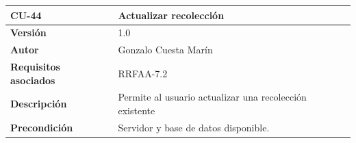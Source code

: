 \documentclass[
]{article}
\begin{document}
\begin{longtable}[]{@{}ll@{}}
\toprule
\begin{minipage}[b]{0.22\columnwidth}\raggedright
\textbf{CU-44}\strut
\end{minipage} & \begin{minipage}[b]{0.72\columnwidth}\raggedright
\textbf{Actualizar recolección}\strut
\end{minipage}\tabularnewline
\midrule
\endhead
\begin{minipage}[t]{0.22\columnwidth}\raggedright
\textbf{Versión}\strut
\end{minipage} & \begin{minipage}[t]{0.72\columnwidth}\raggedright
1.0\strut
\end{minipage}\tabularnewline
\begin{minipage}[t]{0.22\columnwidth}\raggedright
\textbf{Autor}\strut
\end{minipage} & \begin{minipage}[t]{0.72\columnwidth}\raggedright
Gonzalo Cuesta Marín\strut
\end{minipage}\tabularnewline
\begin{minipage}[t]{0.22\columnwidth}\raggedright
\textbf{Requisitos asociados}\strut
\end{minipage} & \begin{minipage}[t]{0.72\columnwidth}\raggedright
RRFAA-7.2\strut
\end{minipage}\tabularnewline
\begin{minipage}[t]{0.22\columnwidth}\raggedright
\textbf{Descripción}\strut
\end{minipage} & \begin{minipage}[t]{0.72\columnwidth}\raggedright
Permite al usuario actualizar una recolección existente\strut
\end{minipage}\tabularnewline
\begin{minipage}[t]{0.22\columnwidth}\raggedright
\textbf{Precondición}\strut
\end{minipage} & \begin{minipage}[t]{0.72\columnwidth}\raggedright
Servidor y base de datos disponible.


\end{minipage}
\end{longtable}
\end{document}
